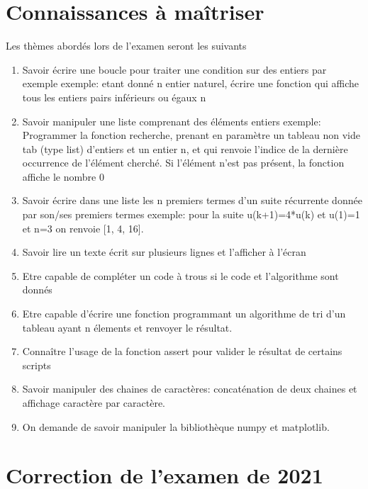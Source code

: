 \documentclass[a4paper,12pt]{article}
\begin{document}
\section{Connaissances \`a ma\^itriser}
Les th\`emes abord\'es lors de l'examen seront les suivants 
\begin{enumerate}
\item Savoir \'ecrire une boucle pour traiter une condition sur des entiers par exemple 
   exemple: etant donn\'e n entier naturel, \'ecrire une fonction qui affiche tous les entiers pairs inf\'erieurs ou \'egaux n

\item Savoir manipuler une liste comprenant des \'el\'ements entiers
   exemple: Programmer la fonction recherche, prenant en param\`etre un tableau non vide tab (type
   list) d'entiers et un entier n, et qui renvoie l'indice de la derni\`ere occurrence de
  l'\'el\'ement cherch\'e. Si l'\'el\'ement n'est pas pr\'esent, la fonction affiche le nombre 0

\item Savoir \'ecrire dans une liste les n premiers termes d'un suite r\'ecurrente donn\'ee par son/ses premiers termes
   exemple: pour la suite u(k+1)=4*u(k) et u(1)=1 et  n=3
   on renvoie [1, 4, 16].

\item Savoir lire un texte \'ecrit sur plusieurs lignes et l'afficher à l'\'ecran

\item Etre capable de compl\'eter un code à trous si le code et l'algorithme sont donn\'es

\item Etre capable d'\'ecrire une fonction programmant un algorithme de tri d'un tableau ayant n \'elements et renvoyer le r\'esultat.

\item Conna\^itre l'usage de la fonction assert pour valider le r\'esultat de certains scripts

\item Savoir manipuler des chaines de caract\`eres: concat\'enation de deux chaines et affichage caract\`ere par caract\`ere.

\item On demande de savoir manipuler la biblioth\`eque numpy et matplotlib.
\end{enumerate}

\clearpage
\section{Correction de l'examen de 2021}
\end{document}
